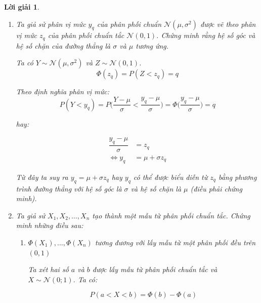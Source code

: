 \documentclass[14pt, a4paper]{article}
\theoremstyle{sltheorem}
\theoremstyle{soltheorem}
\newtheorem*{loigiai}{Lời giải}
\begin{document}
\begin{loigiai}
\begin{enumerate}[wide, labelwidth=!, labelindent=0pt,label=\textbf{\arabic*}.]
        \begin{equation*}
            \sigma = \dfrac{x_j - x_k}{1.349}
        \end{equation*}

        \item Ta giả sử phân vị mức $y_q$ của phân phối chuẩn $\mathcal{N}(\mu, \sigma^2)$ được vẽ theo phân vị mức $z_q$ của phân phối chuẩn tắc $\mathcal{N}(0, 1)$.
        Chứng minh rằng hệ số góc và hệ số chặn của đường thẳng là $\sigma$ và $\mu$ tương ứng.

        Ta có $Y \sim \mathcal{N}(\mu, \sigma^2)$ và $Z \sim \mathcal{N}(0, 1)$.
        \begin{equation*}
            \Phi(z_q) = P(Z < z_q) = q
        \end{equation*}

        Theo định nghĩa phân vị mức:
        \begin{equation*}
            P(Y < y_q) = P\Big(\dfrac{Y - \mu}{\sigma} < \dfrac{y_q - \mu}{\sigma}\Big) = \Phi\Big(\dfrac{y_q - \mu}{\sigma}\Big) = q
        \end{equation*}

        hay:

        \begin{equation*}
            \begin{aligned}
                \dfrac{y_q - \mu}{\sigma} &= z_q \\
                \Leftrightarrow y_q &= \mu + \sigma z_q
            \end{aligned}
        \end{equation*}

        Từ đây ta suy ra $y_q = \mu + \sigma z_q$ hay $y_q$ có thể được biểu diễn từ $z_q$ bằng phương trình đường thẳng với hệ số góc là $\sigma$ và hệ số chặn là $\mu$ (điều phải chứng minh).

        \item Ta giả sử $X_1, X_2, \dots, X_n$ tạo thành một mẫu từ phân phối chuẩn tắc.
        Chứng minh những điều sau:

        \begin{enumerate}
            \item $\Phi(X_1), \dots, \Phi(X_n)$ tương đương với lấy mẫu từ một phân phối đều trên $(0, 1)$
            
            Ta xét hai số $a$ và $b$ được lấy mẫu từ phân phối chuẩn tắc và $X \sim \mathcal{N}(0;1)$.
            Ta có:

            \begin{equation*}
                P(a < X < b) = \Phi(b) - \Phi(a)
            \end{equation*}


\end{enumerate}
\end{enumerate}
\end{loigiai}
\end{document}
